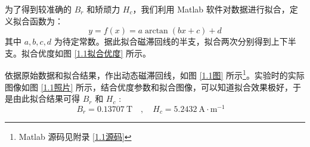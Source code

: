 \documentclass[UTF8]{article}
\theoremstyle{MyLineTheoremStyle} %
\theoremstyle{MyBlockTheoremStyle} %
\theoremstyle{MySubsubsectionStyle} %
\begin{document}
为了得到较准确的 $B_r$ 和矫顽力 $H_c$，我们利用 Matlab 软件对数据进行拟合，定义拟合函数为：
\begin{equation}
y = f(x) = a \arctan (b x + c) + d
\end{equation}
其中 $a, b, c, d$ 为待定常数。据此拟合磁滞回线的半支，拟合两次分别得到上下半支。拟合优度如图 \ref{1.1拟合优度} 所示。

依据原始数据和拟合结果，作出动态磁滞回线，如图 \ref{1.1图} 所示\footnote{Matlab 源码见附录 \ref{1.1源码}}。实验时的实际图像如图 \ref{1.1照片} 所示，结合优度参数和拟合图像，可以知道拟合效果极好，于是由此拟合结果可得 $B_r$ 和 $H_c$ :
\begin{equation}
    B_r = 0.13707 \ \mathrm{T}\quad ,\quad H_c = 5.2432 \ \mathrm{A\cdot m^{-1}}\quad
\end{equation}
\end{document}
